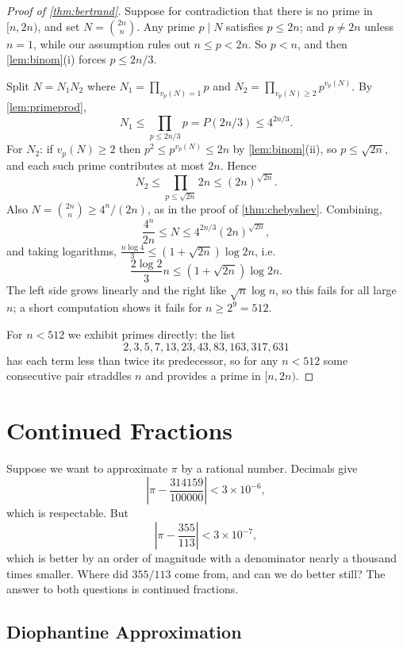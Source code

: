 \documentclass[a4paper]{scrartcl}
\begin{document}
\begin{proof}[Proof of \autoref{thm:bertrand}]
	Suppose for contradiction that there is no prime in $[n, 2n)$, and set $N = \binom{2n}n$. Any prime $p \mid N$ satisfies $p \leq 2n$; and $p \neq 2n$ unless $n = 1$, while our assumption rules out $n \leq p < 2n$. So $p < n$, and then \autoref{lem:binom}(i) forces $p \leq 2n/3$.

	Split $N = N_1N_2$ where $N_1 = \prod_{v_p(N) = 1}p$ and $N_2 = \prod_{v_p(N) \geq 2}p^{v_p(N)}$. By \autoref{lem:primeprod},
	$$
	N_1 \leq \prod_{p \leq 2n/3}p = P(2n/3) \leq 4^{2n/3}.
	$$
	For $N_2$: if $v_p(N) \geq 2$ then $p^2 \leq p^{v_p(N)} \leq 2n$ by \autoref{lem:binom}(ii), so $p \leq \sqrt{2n}$, and each such prime contributes at most $2n$. Hence
	$$
	N_2 \leq \prod_{p \leq \sqrt{2n}}2n \leq (2n)^{\sqrt{2n}}.
	$$
	Also $N = \binom{2n}n \geq 4^n/(2n)$, as in the proof of \autoref{thm:chebyshev}. Combining,
	$$
	\frac{4^n}{2n} \leq N \leq 4^{2n/3}(2n)^{\sqrt{2n}},
	$$
	and taking logarithms, $\frac{n\log 4}{3} \leq (1 + \sqrt{2n})\log 2n$, i.e.
	$$
	\frac{2\log 2}{3}n \leq \left(1 + \sqrt{2n}\right)\log 2n.
	$$
	The left side grows linearly and the right like $\sqrt n \log n$, so this fails for all large $n$; a short computation shows it fails for $n \geq 2^9 = 512$.

	For $n < 512$ we exhibit primes directly: the list
	$$
	2, 3, 5, 7, 13, 23, 43, 83, 163, 317, 631
	$$
	has each term less than twice its predecessor, so for any $n < 512$ some consecutive pair straddles $n$ and provides a prime in $[n, 2n)$.
\end{proof}

\section{Continued Fractions}

Suppose we want to approximate $\pi$ by a rational number. Decimals give
$$
\left|\pi - \frac{314159}{100000}\right| < 3\times 10^{-6},
$$
which is respectable. But
$$
\left|\pi - \frac{355}{113}\right| < 3\times10^{-7},
$$
which is better by an order of magnitude with a denominator nearly a thousand times smaller. Where did $355/113$ come from, and can we do better still? The answer to both questions is continued fractions.

\subsection{Diophantine Approximation}
\end{document}

